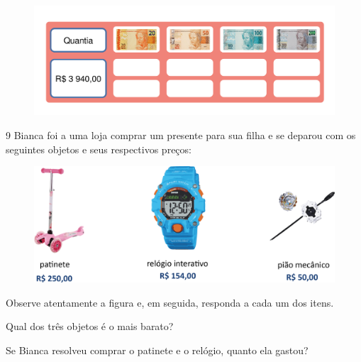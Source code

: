 \begin{figure}[htpb!]
\centering
\includegraphics[width=\textwidth]{./media/image70.png}
\end{figure}


\num{9} Bianca foi a uma loja comprar um presente para sua filha e se deparou
com os seguintes objetos e seus respectivos preços:

\begin{figure}[htpb!]
\centering
\includegraphics[width=\textwidth]{./media/image72.png}
\end{figure}

Observe atentamente a figura e, em seguida, responda a cada um dos itens.

\begin{escolha}
\item Qual dos três objetos é o mais barato?

\item Se Bianca resolveu comprar o patinete e o relógio, quanto ela gastou?
\end{escolha}

